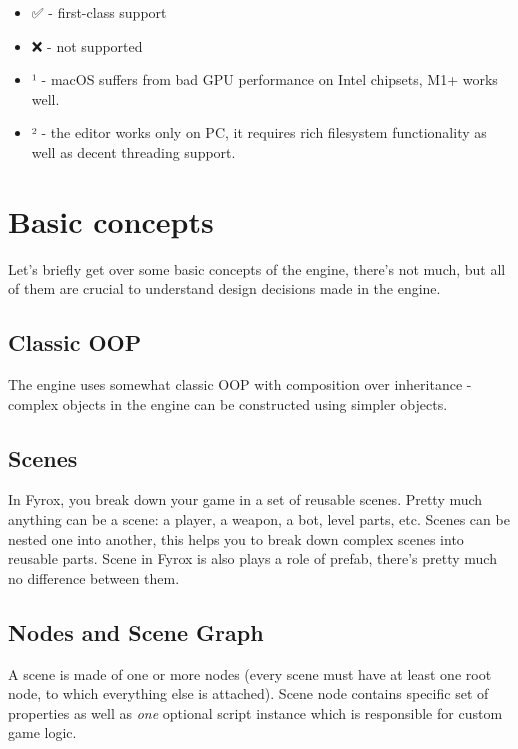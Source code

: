 \documentclass[
]{book}
\providecommand{\tightlist}{%
  \setlength{\itemsep}{0pt}\setlength{\parskip}{0pt}}
\theoremstyle{definition}
\theoremstyle{definition}
\theoremstyle{definition}
\theoremstyle{definition}
\theoremstyle{remark}
\begin{document}
\begin{itemize}
\tightlist
\item
  ✅ - first-class support
\item
  ❌ - not supported
\item
  ¹ - macOS suffers from bad GPU performance on Intel chipsets, M1+ works well.
\item
  ² - the editor works only on PC, it requires rich filesystem functionality as well as decent threading support.
\end{itemize}

\section{Basic concepts}\label{basic-concepts}

Let's briefly get over some basic concepts of the engine, there's not much, but all of them are crucial to understand design decisions made in the engine.

\subsection{Classic OOP}\label{classic-oop}

The engine uses somewhat classic OOP with composition over inheritance - complex objects in the engine can be constructed using simpler objects.

\subsection{Scenes}\label{scenes}

In Fyrox, you break down your game in a set of reusable scenes. Pretty much anything can be a scene: a player, a weapon, a bot, level parts, etc. Scenes can be nested one into another, this helps you to break down complex scenes into reusable parts. Scene in Fyrox is also plays a role of prefab, there's pretty much no difference between them.

\subsection{Nodes and Scene Graph}\label{nodes-and-scene-graph}

A scene is made of one or more nodes (every scene must have at least one root node, to which everything else is attached). Scene node contains specific set of properties as well as \emph{one} optional script instance which is responsible for custom game logic.
\end{document}
